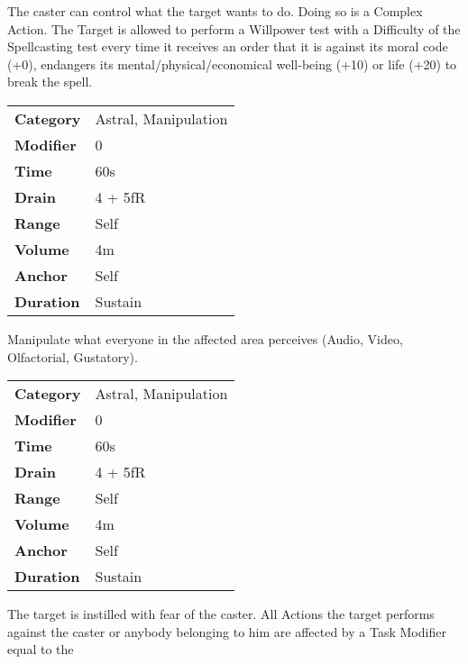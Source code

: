\hfil

The caster can control what the target wants to do. Doing so is
a Complex Action. The Target is allowed to perform a Willpower test with
a Difficulty of the Spellcasting test every time it receives an order
that it is against its moral code (+0), endangers its
mental/physical/economical well-being (+10) or life (+20) to break the
spell.



\begin{tabular}{ll}
    \textbf{Category} & Astral, Manipulation \\
    \textbf{Modifier} & 0                    \\
    \textbf{Time}     & 60s                  \\
    \textbf{Drain}    & 4 + 5fR              \\
    \textbf{Range}    & Self                 \\
    \textbf{Volume}   & 4m                   \\
    \textbf{Anchor}   & Self                 \\
    \textbf{Duration} & Sustain              \\
\end{tabular}

\hfil

Manipulate what everyone in the affected area perceives (Audio,
Video, Olfactorial, Gustatory).


\begin{tabular}{ll}
    \textbf{Category} & Astral, Manipulation \\
    \textbf{Modifier} & 0                    \\
    \textbf{Time}     & 60s                  \\
    \textbf{Drain}    & 4 + 5fR              \\
    \textbf{Range}    & Self                 \\
    \textbf{Volume}   & 4m                   \\
    \textbf{Anchor}   & Self                 \\
    \textbf{Duration} & Sustain              \\
\end{tabular}

\hfil

The target is instilled with fear of the caster. All
Actions the target performs against the caster or
anybody belonging to him are affected by a Task
Modifier equal to the


